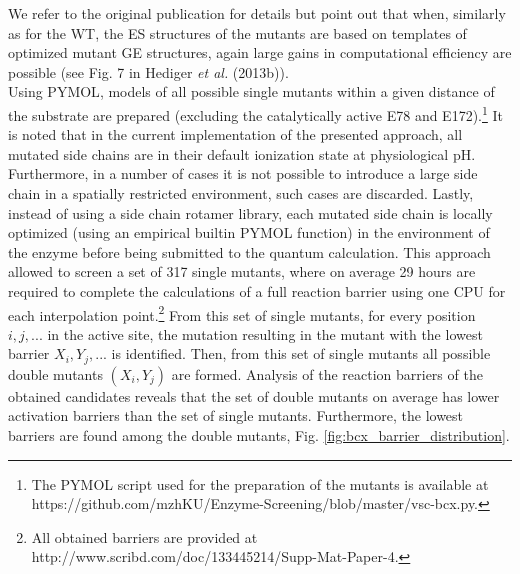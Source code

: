 We refer to the original publication for details\cite{hediger2013computational} but point out that when, similarly as for the WT, the ES structures of the mutants are based on templates of optimized mutant GE structures, again large gains in computational efficiency are possible (see Fig. 7 in Hediger \textit{et al.} (2013b)).\\
Using PYMOL\cite{PyMOLu}, models of all possible single mutants within a given distance of the substrate are prepared (excluding the catalytically active E78 and E172).\footnote{The PYMOL script used for the preparation of the mutants is available at https://github.com/mzhKU/Enzyme-Screening/blob/master/vsc-bcx.py.}
It is noted that in the current implementation of the presented approach, all mutated side chains are in their default ionization state at physiological pH.
Furthermore, in a number of cases it is not possible to introduce a large side chain in a spatially restricted environment, such cases are discarded.
Lastly, instead of using a side chain rotamer library, each mutated side chain is locally optimized (using an empirical builtin PYMOL function) in the environment of the enzyme before being submitted to the quantum calculation.
This approach allowed to screen a set of 317 single mutants, where on average 29 hours are required to complete the calculations of a full reaction barrier using one CPU for each interpolation point.\footnote{All obtained barriers are provided at http://www.scribd.com/doc/133445214/Supp-Mat-Paper-4.}
From this set of single mutants, for every position $i, j, ...$ in the active site, the mutation resulting in the mutant with the lowest barrier $X_i, Y_j, ...$ is identified.
Then, from this set of single mutants all possible double mutants $(X_i, Y_j)$ are formed.
Analysis of the reaction barriers of the obtained candidates reveals that the set of double mutants on average has lower activation barriers than the set of single mutants.
Furthermore, the lowest barriers are found among the double mutants, Fig. \ref{fig:bcx_barrier_distribution}.
